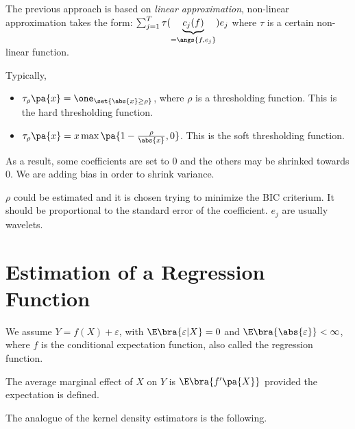 \newpage
{}

The previous approach is based on \textit{linear approximation}, non-linear approximation takes the form: $\sum_{j=1}^T\tau(\underbrace{c_j(f)}_{=\angs{f,e_j}})e_j$ where $\tau$ is a certain non-linear function.

Typically,
\begin{itemize}
\item $\tau_\rho \pa{x} = \one_{\set{\abs{x}\geq \rho}}$, where $\rho$ is a thresholding function. This is the hard thresholding function.
\item $\tau_\rho \pa{x} = x \max \pa{1-\frac{\rho}{\abs{x}},0}$. This is the soft thresholding function.
\end{itemize}
As a result, some coefficients are set to $0$ and the others may be shrinked towards $0$. We are adding bias in order to shrink variance.

$\rho$ could be estimated and it is chosen trying to minimize the BIC criterium. It should be proportional to the standard error of the coefficient. $e_j$ are usually wavelets.

\section{Estimation of a Regression Function}

We assume $Y=f(X)+\varepsilon$, with $\E\bra{\varepsilon |X}=0$ and $\E\bra{\abs{\varepsilon}}<\infty$, where $f$ is the conditional expectation function, also called the regression function.

\begin{definition}
  The average marginal effect of $X$ on $Y$ is $\E\bra{f'\pa{X}}$ provided the expectation is defined.
\end{definition}

The analogue of the kernel density estimators is the following.
